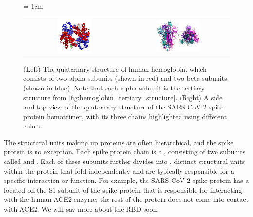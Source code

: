\begin{figure}[h]
	\centering
	\mySfFamily
	\tabcolsep = 1em
	\begin{tabular}{c c}
	\includegraphics[width = 0.35\textwidth]{../images/hemoglobin_quaternary_structure.png} & \includegraphics[width = 0.45\textwidth]{../images/spike_protein_homotrimer.png}
	\end{tabular}
	\caption{(Left) The quaternary structure of human hemoglobin, which consists of two alpha subunits (shown in red) and two beta subunits (shown in blue). Note that each alpha subunit is the tertiary structure from \autoref{fig:hemoglobin_tertiary_structure}. (Right) A side and top view of the quaternary structure of the SARS-CoV-2 spike protein homotrimer, with its three chains highlighted using different colors.}
	\label{fig:quaternary_structure}
\end{figure}

The structural units making up proteins are often hierarchical, and the spike protein is no exception. Each spike protein chain is a , consisting of two subunits called  and . Each of these subunits further divides into , distinct structural units within the protein that fold independently and are typically responsible for a specific interaction or function. For example, the SARS-CoV-2 spike protein has a  located on the S1 subunit of the spike protein that is responsible for interacting with the human ACE2 enzyme; the rest of the protein does not come into contact with ACE2. We will say more about the RBD soon.

